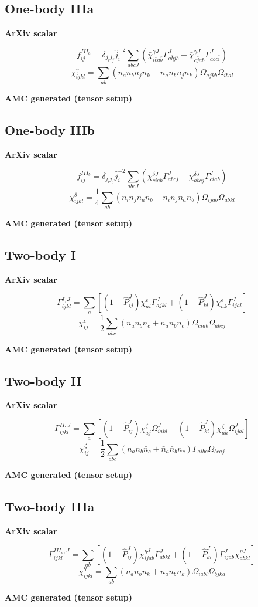\documentclass[11pt]{article}
\newcommand{\CompareBlock}[3]{%
\subsection*{#1}
\noindent
\begin{minipage}[t]{0.48\textwidth}
\textbf{ArXiv scalar}
#2
\end{minipage}\hfill
\begin{minipage}[t]{0.48\textwidth}
\textbf{AMC generated (tensor setup)}

\end{minipage}
\vspace{1em}
}
\begin{document}
\CompareBlock{One-body IIIa}{
\begin{equation*}
 f^{III_a}_{ij}=\delta_{j_i j_j}\hat j_i^{-2}\sum_{abcJ}
\left(\bar\chi^{\gamma J}_{i\bar c a\bar b}\Gamma^J_{a\bar b j\bar c}-\bar\chi^{\gamma J}_{c\bar j a\bar b}\Gamma^J_{a\bar b c\bar i}\right)
\end{equation*}
\begin{equation*}
 \chi^{\gamma}_{ijkl}=\sum_{ab}\left(n_a\bar n_b n_j\bar n_k-\bar n_a n_b\bar n_j n_k\right)\Omega_{ajkb}\Omega_{ibal}
\end{equation*}
}{amc_eq_snippets_clean/dc_f3a_tensor_clean_body.tex}

\CompareBlock{One-body IIIb}{
\begin{equation*}
 f^{III_b}_{ij}=\delta_{j_i j_j}\hat j_i^{-2}\sum_{abcJ}
\left(\chi^{\delta J}_{ciab}\Gamma^J_{abcj}-\chi^{\delta J}_{abcj}\Gamma^J_{ciab}\right)
\end{equation*}
\begin{equation*}
 \chi^{\delta}_{ijkl}=\frac14\sum_{ab}\left(\bar n_i\bar n_j n_a n_b-n_i n_j\bar n_a\bar n_b\right)\Omega_{ijab}\Omega_{abkl}
\end{equation*}
}{amc_eq_snippets_clean/dc_f3b_tensor_clean_body.tex}

\CompareBlock{Two-body I}{
\begin{equation*}
\Gamma^{I,J}_{ijkl}=\sum_a\left[(1-\hat P^J_{ij})\chi^{\epsilon}_{ai}\Gamma^J_{ajkl}+(1-\hat P^J_{kl})\chi^{\epsilon}_{ak}\Gamma^J_{ijal}\right]
\end{equation*}
\begin{equation*}
 \chi^{\epsilon}_{ij}=\frac12\sum_{abc}\left(\bar n_a\bar n_b n_c+n_a n_b\bar n_c\right)\Omega_{ciab}\Omega_{abcj}
\end{equation*}
}{amc_eq_snippets_clean/dc_G1_tensor_clean_body.tex}

\CompareBlock{Two-body II}{
\begin{equation*}
\Gamma^{II,J}_{ijkl}=\sum_a\left[(1-\hat P^J_{ij})\chi^{\zeta}_{aj}\Omega^J_{iakl}-(1-\hat P^J_{kl})\chi^{\zeta}_{ak}\Omega^J_{ijal}\right]
\end{equation*}
\begin{equation*}
 \chi^{\zeta}_{ij}=\frac12\sum_{abc}\left(n_a n_b\bar n_c+\bar n_a\bar n_b n_c\right)\Gamma_{aibc}\Omega_{bcaj}
\end{equation*}
}{amc_eq_snippets_clean/dc_G2_chizeta_tensor_only_body.tex}

\CompareBlock{Two-body IIIa}{
\begin{equation*}
\Gamma^{III_a,J}_{ijkl}=\sum_{ab}\left[(1-\hat P^J_{ij})\chi^{\eta J}_{ijab}\Gamma^J_{abkl}+(1-\hat P^J_{kl})\Gamma^J_{ijab}\chi^{\eta J}_{abkl}\right]
\end{equation*}
\begin{equation*}
 \chi^{\eta}_{ijkl}=\sum_{ab}\left(\bar n_a n_b\bar n_k+n_a\bar n_b n_k\right)\Omega_{iabl}\Omega_{bjka}
\end{equation*}
}{amc_eq_snippets_clean/dc_G3a_tensor_clean_body.tex}
\end{document}
